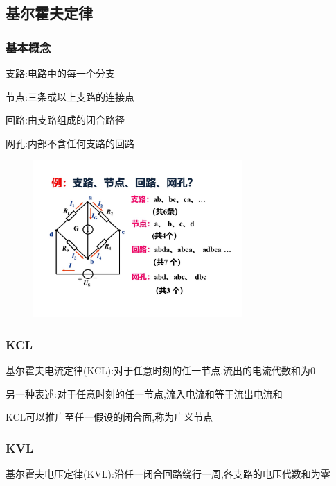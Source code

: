 \documentclass[12pt,a4paper,oneside]{ctexart}
\begin{document}
\subsection{基尔霍夫定律}
\subsubsection{基本概念}
支路:电路中的每一个分支

节点:三条或以上支路的连接点

回路:由支路组成的闭合路径

网孔:内部不含任何支路的回路
\begin{figure}[H]
    \centering
    \includegraphics[width=8cm]{photos/支路节点回路网孔.jpg}
\end{figure}

\subsubsection{KCL}
基尔霍夫电流定律(KCL):对于任意时刻的任一节点,流出的电流代数和为0

另一种表述:对于任意时刻的任一节点,流入电流和等于流出电流和

KCL可以推广至任一假设的闭合面,称为广义节点

\subsubsection{KVL}
基尔霍夫电压定律(KVL):沿任一闭合回路绕行一周,各支路的电压代数和为零
\end{document}

